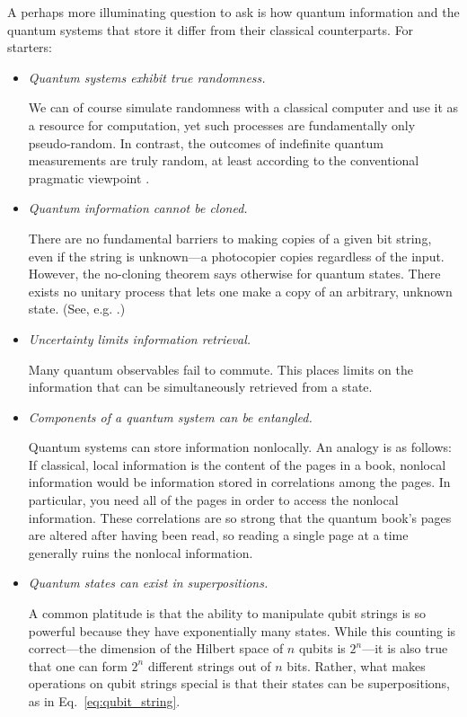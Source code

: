 \documentclass[a4paper,11pt]{article}
\newcommand{\Eq}[1]{Eq.~\eqref{#1}}
\begin{document}
A perhaps more illuminating question to ask is how quantum information and the quantum systems that store it differ from their classical counterparts.
For starters:
\begin{itemize}
\item \emph{Quantum systems exhibit true randomness.}

We can of course simulate randomness with a classical computer and use it as a resource for computation, yet such processes are fundamentally only pseudo-random.
In contrast, the outcomes of indefinite quantum measurements are truly random, at least according to the conventional pragmatic viewpoint \cite{Bell}.

\item \emph{Quantum information cannot be cloned.}

There are no fundamental barriers to making copies of a given bit string, even if the string is unknown---a photocopier copies regardless of the input.
However, the no-cloning theorem says otherwise for quantum states.
There exists no unitary process that lets one make a copy of an arbitrary, unknown state.
(See, e.g. \cite[Chap.~12.3]{griffiths_schroeter_2018}.)

\item \emph{Uncertainty limits information retrieval.}

Many quantum observables fail to commute.
This places limits on the information that can be simultaneously retrieved from a state.

\item \emph{Components of a quantum system can be entangled.}

Quantum systems can store information nonlocally.
An analogy is as follows: If classical, local information is the content of the pages in a book, nonlocal information would be information stored in correlations among the pages.
In particular, you need all of the pages in order to access the nonlocal information.
These correlations are so strong that the quantum book's pages are altered after having been read, so reading a single page at a time generally ruins the nonlocal information.

\item \emph{Quantum states can exist in superpositions.}

A common platitude is that the ability to manipulate qubit strings is so powerful because they have exponentially many states.
While this counting is correct---the dimension of the Hilbert space of $n$ qubits is $2^n$---it is also true that one can form $2^n$ different strings out of $n$ bits.
Rather, what makes operations on qubit strings special is that their states can be superpositions, as in \Eq{eq:qubit_string}.

\end{itemize}
\end{document}
